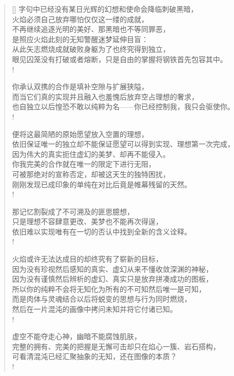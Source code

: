 \documentclass[UTF8, 12pt, a4paper]{ctexrep} %
\begin{document}
\begin{verse}[\versewidth]
字句中已经没有某日光辉的幻想和使命会降临刺破黑暗，\\
火焰必须自己放弃哪怕仅仅这一缕的成就，\\
不再继续追逐光明的美好、那黑暗也不等同罪恶，\\
是照应火焰此刻的无知警醒迷梦延伸目盲：\\
从此矢志燃烧成就破败身躯为了也终究得到独立，\\
眼见囚笼没有打破或者熔断，只是自由的掌握将钢铁首先包容其中。\\!

你承认双携的合作是填补空隙与扩展狭隘，\\
而当它们真的实现并且融入也羞愧后放弃空占理想的奢求，\\
也自独立以后惶恐不敢以纯粹为名——你已经控制我，我只会驱使你。\\!

便将这最简陋的原始愿望放入空置的理想，\\
依旧保证唯一的独立却不能保证愿望可以得到实现、理想第一次完成，\\
因为伟大的真实扼住虚幻的美梦、却再不能侵入。\\
你我完美的合作就在唯一的限定下进行无阻，\\
可被那绝对的宣称否定，却被这天生的独特困扰，\\
刚刚发现已成印象的单纯在对比后竟是帷幕残留的天然。\\!

那记忆割裂成了不可溯及的匪思臆想，\\
只是理想不容肆意更改、美梦也不能再次得逞，\\
依旧难以实现唯有在一切的否认中找到全新的含义诠释。\\!

火焰或许无法达成目的却终究有了崭新的目标，\\
因为没有珍视然后感知的真实、虚幻从来不懂收敛深渊的神秘，\\
因为没有谨慎然后辨析的虚幻、真实只是放弃拼凑成功的图板，\\
所以你的纯粹不会将无知化为所有的不可知然后唯一是可知，\\
而是肉体与灵魂结合以后将蜕变的思想与行为同时燃烧，\\
然后在一片混沌的画像中拷问未知并将它付诸已知。\\!

虚空不能夺走心神，幽暗不能腐蚀肌肤，\\
完整的拥有、完美的把握是无懈可击却只在焰心一簇、岩石搭构，\\
可看清混沌已经汇聚抽象的无知，还在图像的本质？\\!


\end{verse}
\end{document}

